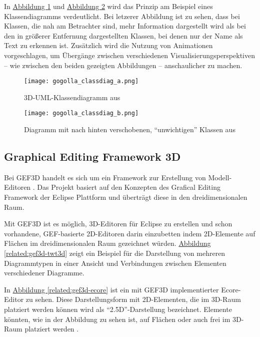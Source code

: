 \documentclass[a4paper,10pt]{sphinxmanual}
\begin{document}
In \hyperref[related:gogolla-classdiag-a]{Abbildung  \ref*{related:gogolla-classdiag-a}} und \hyperref[related:gogolla-classdiag-b]{Abbildung  \ref*{related:gogolla-classdiag-b}} wird das Prinzip am Beispiel eines Klassendiagramms verdeutlicht.
Bei letzerer Abbildung ist zu sehen, dass bei Klassen, die nah am Betrachter sind, mehr Information dargestellt wird als bei den in größerer Entfernung dargestellten Klassen, bei denen nur der Name als Text zu erkennen ist.
Zusätzlich wird die Nutzung von Animationen vorgeschlagen, um Übergänge zwischen verschiedenen Visualisierungsperspektiven – wie zwischen den beiden gezeigten Abbildungen – anschaulicher zu machen.
\begin{figure}[htbp]
\centering
\capstart

\texttt{[image: gogolla\_classdiag\_a.png]}
\caption{3D-UML-Klassendiagramm aus \cite{gogolla_towards_1999}}\label{related:gogolla-classdiag-a}\end{figure}
\begin{figure}[htbp]
\centering
\capstart

\texttt{[image: gogolla\_classdiag\_b.png]}
\caption{Diagramm mit nach hinten verschobenen, "`unwichtigen"' Klassen aus \cite{gogolla_towards_1999}}\label{related:gogolla-classdiag-b}\end{figure}


\subsection{Graphical Editing Framework 3D}
\label{related:gef3d}\label{related:graphical-editing-framework-3d}
Bei GEF3D handelt es sich um ein Framework zur Erstellung von Modell-Editoren \cite{von_pilgrim_gef3d:_2008}.
Das Projekt basiert auf den Konzepten des Grafical Editing Framework der Eclipse Plattform und überträgt diese in den dreidimensionalen Raum.

Mit GEF3D ist es möglich, 3D-Editoren für Eclipse zu erstellen und schon vorhandene, GEF-basierte 2D-Editoren darin einzubetten indem 2D-Elemente auf Flächen im dreidimensionalen Raum gezeichnet würden.
\hyperref[related:gef3d-twt3d]{Abbildung  \ref*{related:gef3d-twt3d}} zeigt ein Beispiel für die Darstellung von mehreren Diagrammtypen in einer Ansicht und Verbindungen zwischen Elementen verschiedener Diagramme.

In \hyperref[related:gef3d-ecore]{Abbildung  \ref*{related:gef3d-ecore}} ist ein mit GEF3D implementierter Ecore-Editor zu sehen.
Diese Darstellungsform mit 2D-Elementen, die im 3D-Raum platziert werden können wird als "`2.5D"'-Darstellung bezeichnet.
Elemente könnten, wie in der Abbildung zu sehen ist, auf Flächen oder auch frei im 3D-Raum platziert werden \cite{www:gef3ddevblog}.
\end{document}

